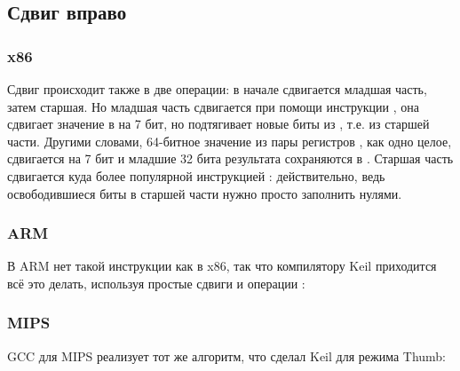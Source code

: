 ﻿\subsection{Сдвиг вправо}



\subsubsection{x86}





Сдвиг происходит также в две операции: в начале сдвигается младшая часть, затем старшая.
Но младшая часть сдвигается при помощи инструкции , она сдвигает значение в \EAX{} на 7 бит, но подтягивает новые биты из \EDX{}, т.е. из старшей части.
Другими словами, 64-битное значение из пары регистров , как одно целое, сдвигается на 7 бит и младшие
32 бита результата сохраняются в \EAX{}.
Старшая часть сдвигается куда более популярной инструкцией \SHR{}: действительно, ведь освободившиеся биты в старшей части нужно
просто заполнить нулями.

\subsubsection{ARM}

В ARM нет такой инструкции как  в x86, так что компилятору Keil приходится всё это делать,
используя простые сдвиги и операции :





\subsubsection{MIPS}

GCC для MIPS реализует тот же алгоритм, что сделал Keil для режима Thumb:




